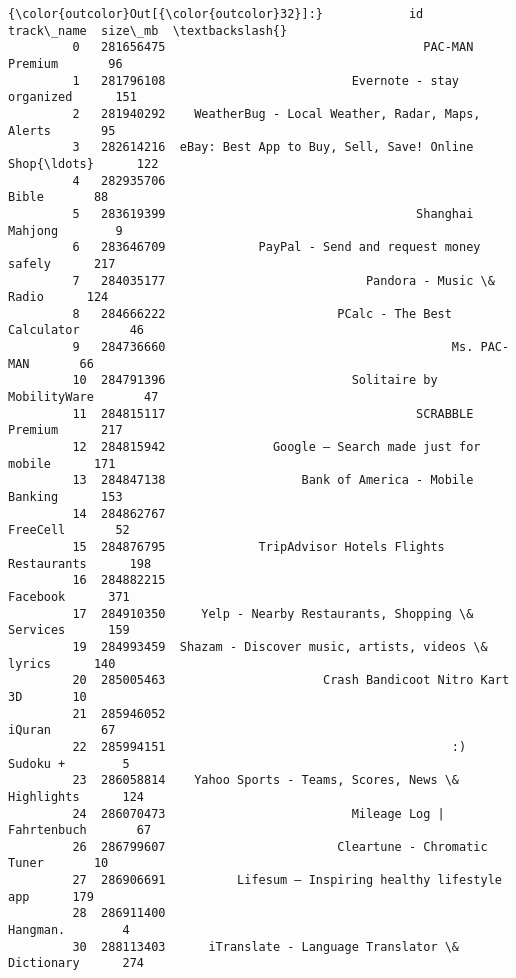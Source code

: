 \documentclass[11pt]{article}
\begin{document}
\begin{Verbatim}[commandchars=\\\{\}]
{\color{outcolor}Out[{\color{outcolor}32}]:}            id                                         track\_name  size\_mb  \textbackslash{}
         0   281656475                                    PAC-MAN Premium       96   
         1   281796108                          Evernote - stay organized      151   
         2   281940292    WeatherBug - Local Weather, Radar, Maps, Alerts       95   
         3   282614216  eBay: Best App to Buy, Sell, Save! Online Shop{\ldots}      122   
         4   282935706                                              Bible       88   
         5   283619399                                   Shanghai Mahjong        9   
         6   283646709             PayPal - Send and request money safely      217   
         7   284035177                            Pandora - Music \& Radio      124   
         8   284666222                        PCalc - The Best Calculator       46   
         9   284736660                                        Ms. PAC-MAN       66   
         10  284791396                          Solitaire by MobilityWare       47   
         11  284815117                                   SCRABBLE Premium      217   
         12  284815942               Google – Search made just for mobile      171   
         13  284847138                   Bank of America - Mobile Banking      153   
         14  284862767                                           FreeCell       52   
         15  284876795             TripAdvisor Hotels Flights Restaurants      198   
         16  284882215                                           Facebook      371   
         17  284910350     Yelp - Nearby Restaurants, Shopping \& Services      159   
         19  284993459  Shazam - Discover music, artists, videos \& lyrics      140   
         20  285005463                      Crash Bandicoot Nitro Kart 3D       10   
         21  285946052                                             iQuran       67   
         22  285994151                                        :) Sudoku +        5   
         23  286058814    Yahoo Sports - Teams, Scores, News \& Highlights      124   
         24  286070473                          Mileage Log | Fahrtenbuch       67   
         26  286799607                        Cleartune - Chromatic Tuner       10   
         27  286906691          Lifesum – Inspiring healthy lifestyle app      179   
         28  286911400                                           Hangman.        4   
         30  288113403      iTranslate - Language Translator \& Dictionary      274   

\end{Verbatim}
\end{document}
